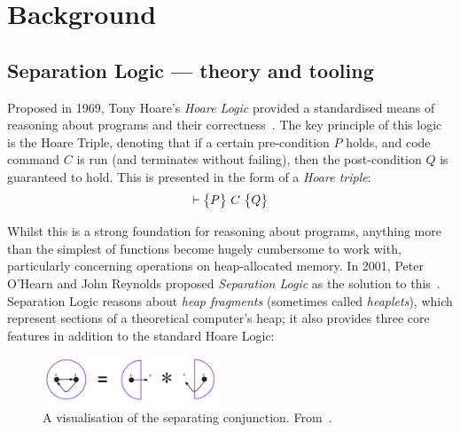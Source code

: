 
\chapter{Background}\label{sec:background}

\section{Separation Logic --- theory and tooling}\label{sec:background:sl-and-tools}

Proposed in 1969, Tony Hoare's \textit{Hoare Logic} provided a standardised
means of reasoning about programs and their correctness~\cite{hoare}. The key
principle of this logic is the Hoare Triple, denoting that if a certain
pre-condition $P$ holds, and code command $C$ is run (and terminates without
failing), then the post-condition $Q$ is guaranteed to hold. This is presented
in the form of a \textit{Hoare triple}:
\[
  \triple{P}{C}{Q}
\]

Whilst this is a strong foundation for reasoning about programs, anything more
than the simplest of functions become hugely cumbersome to work with,
particularly concerning operations on heap-allocated memory. In 2001, Peter
O'Hearn and John Reynolds proposed \textit{Separation Logic} as the solution to
this~\cite{separation-logic}. Separation Logic reasons about
\textit{heap fragments} (sometimes called \textit{heaplets}), which represent
sections of a theoretical computer's heap; it also provides three core features
in addition to the standard Hoare Logic:

\begin{figure}[!b]
  \centering
  \includegraphics[width=200px]{img/separating-conjunction.jpg}
  \caption{
    A visualisation of the separating conjunction.
    From~\cite{infer-sl}.
  }\label{fig:separating-conjunction}
\end{figure}

